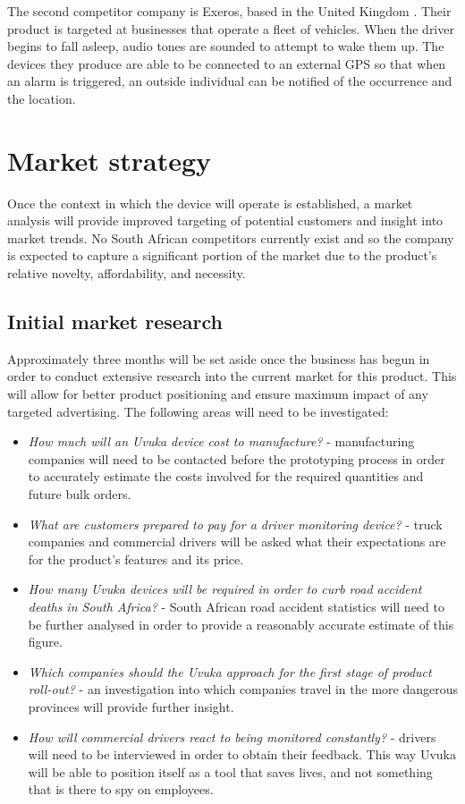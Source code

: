 \pagebreak
The second competitor company is Exeros, based in the United Kingdom \cite{Exeros}. Their product is targeted at businesses that operate a fleet of vehicles. When the driver begins to fall asleep, audio tones are sounded to attempt to wake them up. The devices they produce are able to be connected to an external GPS so that when an alarm is triggered, an outside individual can be notified of the occurrence and the location.

\section{Market strategy}
Once the context in which the device will operate is established, a market analysis will provide improved targeting of potential customers and insight into market trends. No South African competitors currently exist and so the company is expected to capture a significant portion of the market due to the product’s relative novelty, affordability, and necessity.

\subsection{Initial market research}
Approximately three months will be set aside once the business has begun in order to conduct extensive research into the current market for this product. This will allow for better product positioning and ensure maximum impact of any targeted advertising. The following areas will need to be investigated:
\begin{itemize}
	\item \textit{How much will an Uvuka device cost to manufacture?} - manufacturing companies will need to be contacted before the prototyping process in order to accurately estimate the costs involved for the required quantities and future bulk orders.
	\item \textit{What are customers prepared to pay for a driver monitoring device?} - truck companies and commercial drivers will be asked what their expectations are for the product's features and its price.
	\item \textit{How many Uvuka devices will be required in order to curb road accident deaths in South Africa?} - South African road accident statistics will need to be further analysed in order to provide a reasonably accurate estimate of this figure.
	\item \textit{Which companies should the Uvuka approach for the first stage of product roll-out?} - an investigation into which companies travel in the more dangerous provinces will provide further insight.
	\item \textit{How will commercial drivers react to being monitored constantly?} - drivers will need to be interviewed in order to obtain their feedback. This way Uvuka will be able to position itself as a tool that saves lives, and not something that is there to spy on employees.
\end{itemize}

